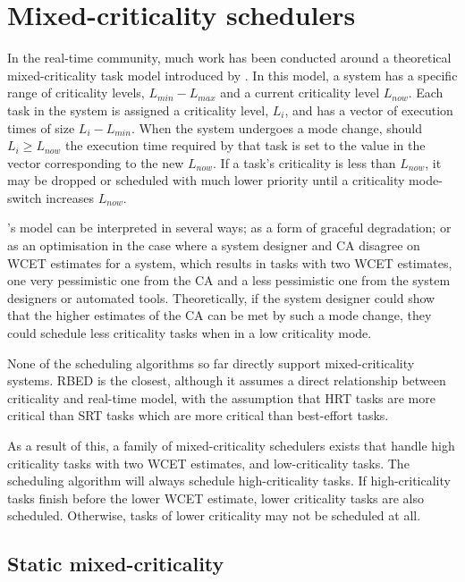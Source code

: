 \section{Mixed-criticality schedulers}
\label{sched:mixed-criticality-schedulers}

In the real-time community, much work has been conducted around a theoretical mixed-criticality task
model introduced by \citet{Vestal_07}.  In this model, a system has a specific range of criticality
levels, $L_{min}-L_{max}$ and a current criticality level $L_{now}$. Each task in the system is
assigned a criticality level, $L_{i}$, and has a vector of execution times of size $L_{i}-L_{min}$.
When the system undergoes a mode change, should $L_{i} \geq L_{now}$ the execution time required by
that task is set to the value in the vector corresponding to the new $L_{now}$. If a task's
criticality is less than $L_{now}$, it may be dropped or scheduled with much lower priority until
a criticality mode-switch increases $L_{now}$.

\citet{Vestal_07}'s model can be interpreted in several ways; as a form of graceful degradation; or as an
optimisation in the case where a system designer and \gls{CA} disagree on \gls{WCET}
estimates for a system, which results in tasks with two {\gls{WCET}} estimates, one very pessimistic one from
the \gls{CA} and a less pessimistic one from the system designers or automated tools. 
Theoretically, if the system designer could show that the higher estimates
of the \gls{CA} can be met by such a mode change, they could schedule less criticality tasks
when in a low criticality mode. 

None of the scheduling algorithms so far directly support mixed-criticality systems.  \gls{RBED} is
the closest, although it assumes a direct relationship between criticality and real-time model, with
the assumption that \gls{HRT} tasks are more critical than \gls{SRT} tasks which are more critical
than best-effort tasks. 

As a result
of this, a family of mixed-criticality schedulers exists that handle high criticality tasks with two
{\gls{WCET}} estimates, and low-criticality tasks.  The scheduling algorithm will always schedule
high-criticality tasks.  If high-criticality tasks finish before the lower \gls{WCET} estimate,
lower criticality tasks are also scheduled.  Otherwise, tasks of lower criticality may not be
scheduled at all. 

\subsection{Static mixed-criticality}


